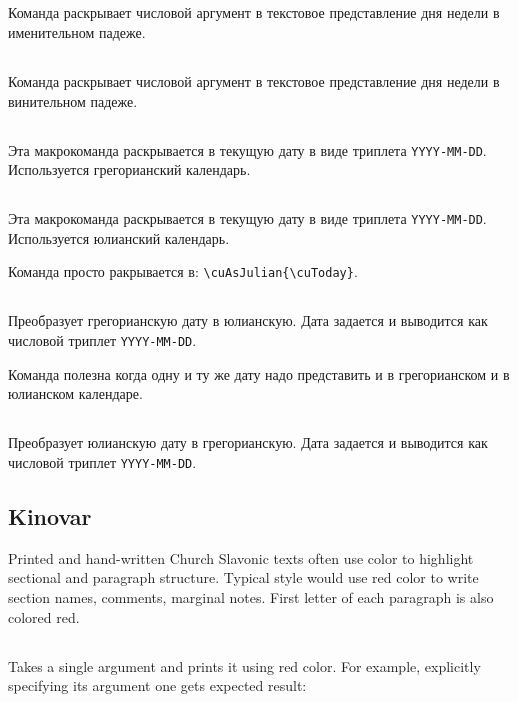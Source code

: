 \begin{RU}
\subsection{}
Команда раскрывает числовой аргумент в текстовое представление дня недели в именительном падеже.

\subsection{}
Команда раскрывает числовой аргумент в текстовое представление дня недели в винительном падеже.

\subsection{}
Эта макрокоманда раскрывается в текущую дату в виде триплета \texttt{YYYY-MM-DD}. Используется грегорианский календарь.

\subsection{}
Эта макрокоманда раскрывается в текущую дату в виде триплета \texttt{YYYY-MM-DD}. Используется юлианский календарь.

Команда просто ракрывается в:  \verb+\cuAsJulian{\cuToday}+.

\subsection{}
Преобразует грегорианскую дату в юлианскую. Дата задается и выводится как числовой триплет \texttt{YYYY-MM-DD}.

Команда полезна когда одну и ту же дату надо представить и в грегорианском и в юлианском календаре.

\subsection{}
Преобразует юлианскую дату в грегорианскую. Дата задается и выводится как числовой триплет \texttt{YYYY-MM-DD}.

\end{RU}

\begin{EN}
\section{Kinovar}
Printed and hand-written Church Slavonic texts often use color to highlight sectional and paragraph structure. Typical style
would use red color to write section names, comments, marginal notes. First letter of each paragraph is also colored red.

\subsection{}
Takes a single argument and prints it using red color. For example, explicitly specifying its argument one gets expected result:

\end{EN}

